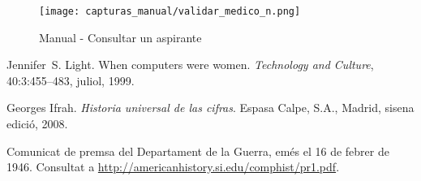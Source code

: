 \documentclass[11pt,spanish,
		listoftables,listoffigures]
		{tfgplantilla}
\begin{document}
\begin{figure}[H]
\centering
\texttt{[image: capturas\_manual/validar\_medico\_n.png]}
\caption{Manual - Consultar un aspirante}
\end{figure}

\begin{thebibliography}{10}

   Jennifer~S. Light.
   \newblock When computers were women.
   \newblock \textit{Technology and Culture}, 40:3:455--483, juliol, 1999.

   Georges Ifrah.
   \newblock \textit{Historia universal de las cifras}.
   \newblock Espasa Calpe, S.A., Madrid, sisena edició, 2008.

   Comunicat de premsa del Departament de la Guerra, 
   emés el 16 de febrer de 1946. 
   \newblock Consultat a 
   \url{http://americanhistory.si.edu/comphist/pr1.pdf}.

\end{thebibliography}

\cleardoublepage
\end{document}
